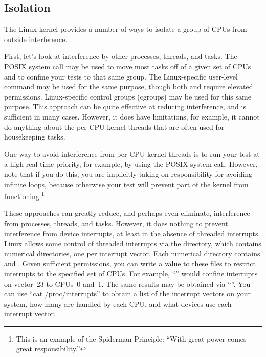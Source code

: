 \subsection{Isolation}
\label{sec:debugging:Isolation}

The Linux kernel provides a number of ways to isolate a group of
CPUs from outside interference.

First, let's look at interference by other processes, threads, and tasks.
The POSIX  system call may be used to move
most tasks off of a given set of CPUs and to confine your tests to
that same group.
The Linux-specific user-level  command may be used for
the same purpose, though both  and
 require elevated permissions.
Linux-specific control groups (cgroups) may be used for this same purpose.
This approach can be quite effective at reducing interference, and
is sufficient in many cases.
However, it does have limitations, for example, it cannot do anything
about the per-CPU kernel threads that are often used for housekeeping
tasks.

One way to avoid interference from per-CPU kernel threads is to run
your test at a high real-time priority, for example, by using
the POSIX  system call.
However, note that if you do this, you are implicitly taking on
responsibility for avoiding infinite loops, because otherwise
your test will prevent part of the kernel from functioning.\footnote{
	This is an example of the Spiderman Principle: ``With great
	power comes great responsibility.''}

These approaches can greatly reduce, and perhaps even eliminate,
interference from processes, threads, and tasks.
However, it does nothing to prevent interference from device
interrupts, at least in the absence of threaded interrupts.
Linux allows some control of threaded interrupts via the
 directory, which contains numerical directories, one
per interrupt vector.
Each numerical directory contains  and
.
Given sufficient permissions, you can write a value to these files
to restrict interrupts to the specified set of CPUs.
For example, ``''
would confine interrupts on vector~23 to CPUs~0 and~1.
The same results may be obtained via
``''.
You can use ``cat /proc/interrupts'' to obtain a list of the interrupt
vectors on your system, how many are handled by each CPU, and what
devices use each interrupt vector.

